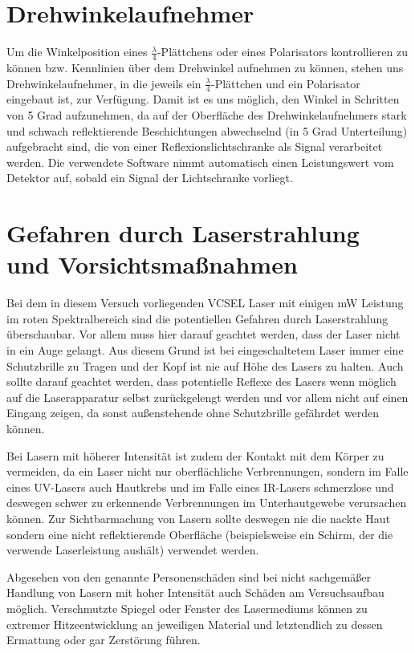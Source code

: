 \documentclass[bigchapter,colorback,accentcolor=tud4b,linedtoc,11pt]{tudreport}
\begin{document}
\section{Drehwinkelaufnehmer}
Um die Winkelposition eines $\frac{\lambda}{4}$-Plättchens oder eines Polarisators kontrollieren zu können bzw. Kennlinien über dem Drehwinkel aufnehmen zu können, stehen uns Drehwinkelaufnehmer, in die jeweils ein $\frac{\lambda}{4}$-Plättchen und ein Polarisator eingebaut ist, zur Verfügung. Damit ist es uns möglich, den Winkel in Schritten von 5 Grad aufzunehmen, da auf der Oberfläche des Drehwinkelaufnehmers stark und schwach reflektierende Beschichtungen abwechselnd (in 5 Grad Unterteilung) aufgebracht sind, die von einer Reflexionslichtschranke als Signal verarbeitet werden. Die verwendete Software nimmt automatisch einen Leistungswert vom Detektor auf, sobald ein Signal der Lichtschranke vorliegt. 


\section{Gefahren durch Laserstrahlung und Vorsichtsmaßnahmen}
Bei dem in diesem Versuch vorliegenden VCSEL Laser mit einigen mW Leistung im roten Spektralbereich sind die potentiellen Gefahren durch Laserstrahlung überschaubar. Vor allem muss hier darauf geachtet werden, dass der Laser nicht in ein Auge gelangt. Aus diesem Grund ist bei eingeschaltetem Laser immer eine Schutzbrille zu Tragen und der Kopf ist nie auf Höhe des Lasers zu halten. Auch sollte darauf geachtet werden, dass potentielle Reflexe des Lasers wenn möglich auf die Laserapparatur selbst zurückgelengt werden und vor allem nicht auf einen Eingang zeigen, da sonst außenstehende ohne Schutzbrille gefährdet werden können.

Bei Lasern mit höherer Intensität ist zudem der Kontakt mit dem Körper zu vermeiden, da ein Laser nicht nur oberflächliche Verbrennungen, sondern im Falle eines UV-Lasers auch Hautkrebs und im Falle eines IR-Lasers schmerzlose und deswegen schwer zu erkennende Verbrennungen im Unterhautgewebe verursachen können. Zur Sichtbarmachung von Lasern sollte deswegen nie die nackte Haut sondern eine nicht reflektierende Oberfläche (beispielsweise ein Schirm, der die verwende Laserleistung aushält) verwendet werden.

Abgesehen von den genannte Personenschäden sind bei nicht sachgemäßer Handlung von Lasern mit hoher Intensität auch Schäden am Versuchsaufbau möglich. Verschmutzte Spiegel oder Fenster des Lasermediums können zu extremer Hitzeentwicklung an jeweiligen Material und letztendlich zu dessen Ermattung oder gar Zerstörung führen.
\cite{GefahrenLaser}
\end{document}
